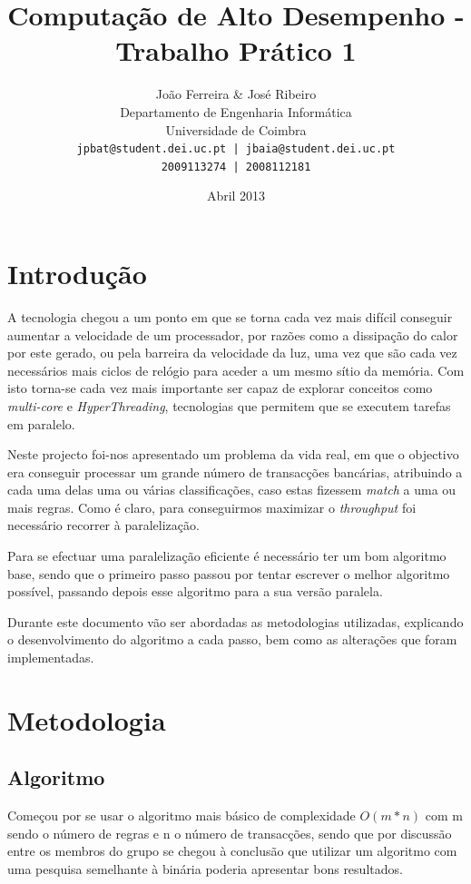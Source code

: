\documentclass[a4paper]{article}
\title{Computação de Alto Desempenho - Trabalho Prático 1}
\author{João Ferreira \& José Ribeiro\\
		Departamento de Engenharia Informática\\
		Universidade de Coimbra\\
		\texttt{jpbat@student.dei.uc.pt | jbaia@student.dei.uc.pt}\\
		\texttt{2009113274 | 2008112181}}
\date{Abril 2013}
\begin{document}
\maketitle

\cleardoublepage

\tableofcontents
\cleardoublepage

\setlength{\parindent}{1cm}
\setlength{\parskip}{0.3cm}

\section{Introdução}
\indent \indent A tecnologia chegou a um ponto em que se torna cada vez mais difícil conseguir aumentar a velocidade de um processador, por razões como a dissipação do calor por este gerado, ou pela barreira da velocidade da luz, uma vez que são cada vez necessários mais ciclos de relógio para aceder a um mesmo sítio da memória. Com isto torna-se cada vez mais importante ser capaz de explorar conceitos como \textit{multi-core} e \textit{HyperThreading}, tecnologias que permitem que se executem tarefas em paralelo.

Neste projecto foi-nos apresentado um problema da vida real, em que o objectivo era conseguir processar um grande número de transacções bancárias, atribuindo a cada uma delas uma ou várias classificações, caso estas fizessem \textit{match} a uma ou mais regras. Como é claro, para conseguirmos maximizar o \textit{throughput} foi necessário recorrer à paralelização.

Para se efectuar uma paralelização eficiente é necessário ter um bom algoritmo base, sendo que o primeiro passo passou por tentar escrever o melhor algoritmo possível, passando depois esse algoritmo para a sua versão paralela.

Durante este documento vão ser abordadas as metodologias utilizadas, explicando o desenvolvimento do algoritmo a cada passo, bem como as alterações que foram implementadas. 
\clearpage

\section{Metodologia}
\subsection{Algoritmo}
\indent \indent Começou por se usar o algoritmo mais básico de complexidade $O(m * n)$ com m sendo o número de regras e n o número de transacções, sendo que por discussão entre os membros do grupo se chegou à conclusão que utilizar um algoritmo com uma pesquisa semelhante à binária poderia apresentar bons resultados.
\end{document}
